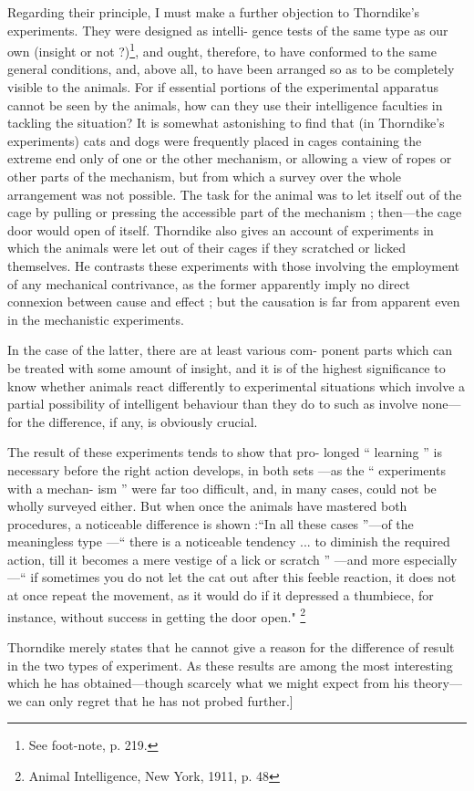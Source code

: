\documentclass{article}
\begin{document}
Regarding their principle, I must make a further objection
to Thorndike’s experiments. They were designed as intelli-
gence tests of the same type as our own (insight or not ?)\footnote{See foot-note, p. 219.},
and ought, therefore, to have conformed to the same general
conditions, and, above all, to have been arranged so as to be
completely visible to the animals. For if essential portions
of the experimental apparatus cannot be seen by the animals,
how can they use their intelligence faculties in tackling
the situation? It is somewhat astonishing to find that
(in Thorndike’s experiments) cats and dogs were frequently
placed in cages containing the extreme end only of one or
the other mechanism, or allowing a view of ropes or other
parts of the mechanism, but from which a survey over the
whole arrangement was not possible. The task for the animal
was to let itself out of the cage by pulling or pressing the
accessible part of the mechanism ; then—the cage door
would open of itself. Thorndike also gives an account of
experiments in which the animals were let out of their cages
if they scratched or licked themselves. He contrasts these
experiments with those involving the employment of any
mechanical contrivance, as the former apparently imply
no direct connexion between cause and effect ; but the
causation is far from apparent even in the mechanistic
experiments.

In the case of the latter, there are at least various com-
ponent parts which can be treated with some amount of
insight, and it is of the highest significance to know whether
animals react differently to experimental situations which
involve a partial possibility of intelligent behaviour than
they do to such as involve none—for the difference, if any,
is obviously crucial.

The result of these experiments tends to show that pro-
longed “ learning ” is necessary before the right action
develops, in both sets —as the “ experiments with a mechan-
ism ” were far too difficult, and, in many cases, could not be
wholly surveyed either. But when once the animals have
mastered both procedures, a noticeable difference is shown
:“In all these cases ”—of the meaningless type —“ there is a
noticeable tendency ... to diminish the required action,
till it becomes a mere vestige of a lick or scratch ” —and
more especially—“ if sometimes you do not let the cat
out after this feeble reaction, it does not at once repeat
the movement, as it would do if it depressed a thumbiece, for instance, without success in getting the door
open." \footnote{Animal Intelligence, New York, 1911, p. 48}

Thorndike merely states that he cannot give a reason
for the difference of result in the two types of experiment.
As these results are among the most interesting which he
has obtained—though scarcely what we might expect from
his theory—we can only regret that he has not probed further.]
\end{document}
